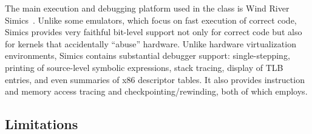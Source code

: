 The main execution and debugging
platform used in the class is
Wind River Simics~\cite{simics}.
Unlike some emulators,
which focus on fast execution of correct code,
Simics
provides very faithful bit-level support
not only for correct code %
but also for kernels that accidentally ``abuse'' hardware.
Unlike hardware virtualization environments,
Simics contains substantial debugger support:
single-stepping,
printing of source-level symbolic
expressions,
stack tracing,
display of TLB entries,
and even summaries of x86
descriptor tables.
It also provides instruction and memory access tracing and checkpointing/rewinding, both of which \landslide employs.


\subsection{Limitations}


